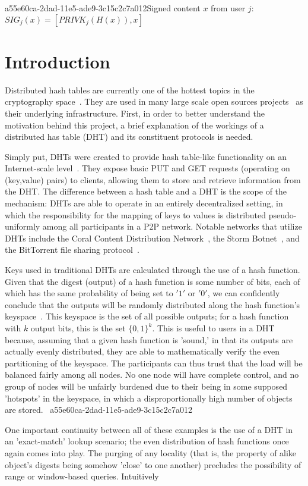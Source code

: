 \documentclass[12pt]{article}
\begin{document}
a55e60ca-2dad-11e5-ade9-3c15c2c7a012Signed content $x$ from user $j$: $SIG_j(x) = \left[ PRIVK_j( H(x) ), x \right]$

\section{Introduction}
\par Distributed hash tables are currently one of the hottest topics in the cryptography space~\cite{Stoica:2001dj,Rowstron:2001ea,Ratnasamy:2001wn}. They are used in many large scale open sources projects~\cite{Freitas:2013tb,Xu:2010vs,Perfitt:2010fh} as their underlying infrastructure. First, in order to better understand the motivation behind this project, a brief explanation of the workings of a distributed has table (DHT) and its constituent protocols is needed.

\par Simply put, DHTs were created to provide hash table-like functionality on an Internet-scale level~\cite{Ratnasamy:2001wn}. They expose basic PUT and GET requests (operating on (key,value) pairs) to clients, allowing them to store and retrieve information from the DHT. The difference between a hash table and a DHT is the scope of the mechanism: DHTs are able to operate in an entirely decentralized setting, in which the responsibility for the mapping of keys to values is distributed pseudo-uniformly among all participants in a P2P network. Notable networks that utilize DHTs include the Coral Content Distribution Network~\cite{Freedman:2004vb}, the Storm Botnet~\cite{Holz:2008uk}, and the BitTorrent file sharing protocol~\cite{Cohen:y1_8mBnw}.

\par Keys used in traditional DHTs are calculated through the use of a hash function. Given that the digest (output) of a hash function is some number of bits, each of which has the same probability of being set to $'1'$ or $'0'$, we can confidently conclude that the outputs will be randomly distributed along the hash function's keyspace~. This keyspace is the set of all possible outputs; for a hash function with $k$ output bits, this is the set $\{0,1\}^k$. This is useful to users in a DHT because, assuming that a given hash function is 'sound,' in that its outputs are actually evenly distributed, they are able to mathematically verify the even partitioning of the keyspace. The participants can thus trust that the load will be balanced fairly among all nodes. No one node will have complete control, and no group of nodes will be unfairly burdened due to their being in some supposed 'hotspots' in the keyspace, in which a disproportionally high number of objects are stored.~
a55e60ca-2dad-11e5-ade9-3c15c2c7a012
\par One important continuity between all of these examples is the use of a DHT in an 'exact-match' lookup scenario; the even distribution of hash functions once again comes into play. The purging of any locality (that is, the property of alike object's digests being somehow 'close' to one another) precludes the possibility of range or window-based queries. Intuitively
\end{document}
